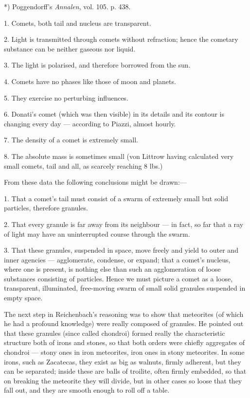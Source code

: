 \documentclass[a4paper, 12pt, oneside, polutonikogreek, english]{article}
\begin{document}
*) Poggendorff's \emph{Annalen}, vol. 105. p. 438.

1. Comets, both tail and nucleus are transparent.

2. Light is transmitted through comets without refraction; hence the cometary substance can be neither gaseous nor liquid.

3. The light is polarised, and therefore borrowed from the sun.

4. Comets have no phases like those of moon and planets.

5. They exercise no perturbing influences.

6. Donati's comet (which was then visible) in its details and its contour is changing every day --- according to Piazzi, almost hourly.

7. The density of a comet is extremely small.

8. The absolute mass is sometimes small (von Littrow having calculated very small comets, tail and all, as scarcely reaching 8 lbs.)

From these data the following conclusions might be drawn:---

1. That a comet's tail must consist of a swarm of extremely small but solid particles, therefore granules.

2. That every granule is far away from its neighbour --- in fact, so far that a ray of light may have an uninterrupted course through the swarm.

3. That these granules, suspended in space, move freely and yield to outer and inner agencies --- agglomerate, condense, or expand; that a comet's nucleus, where one is present, is nothing else than such an agglomeration of loose substances consisting of particles. Hence we must picture a comet as a loose, transparent, illuminated, free-moving swarm of small solid granules suspended in empty space.

The next step in Reichenbach's reasoning was to show that meteorites (of which he had a profound knowledge) were really composed of granules. He pointed out that these granules (since called chondroi) formed really the characteristic structure both of irons and stones, so that both orders were chiefly aggregates of chondroi --- stony ones in iron meteorites, iron ones in stony meteorites. In some irons, such as Zacatecas, they exist as big as walnuts, firmly adherent, but they can be separated; inside these are balls of troilite, often firmly embedded, so that on breaking the meteorite they will divide, but in other cases so loose that they fall out, and they are smooth enough to roll off a table.
\end{document}
